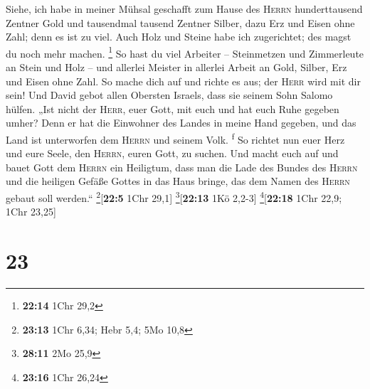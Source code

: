  Siehe, ich habe in meiner Mühsal geschafft zum Hause des
\textsc{Herrn} hunderttausend Zentner Gold und tausendmal tausend
Zentner Silber, dazu Erz und Eisen ohne Zahl; denn es ist zu viel. Auch
Holz und Steine habe ich zugerichtet; des magst du noch mehr machen.
\footnote{\textbf{22:14} 1Chr 29,2}  So hast du viel
Arbeiter -- Steinmetzen und Zimmerleute an Stein und Holz -- und
allerlei Meister in allerlei Arbeit  an Gold, Silber, Erz
und Eisen ohne Zahl. So mache dich auf und richte es aus; der
\textsc{Herr} wird mit dir sein!  Und David gebot allen
Obersten Israels, dass sie seinem Sohn Salomo hülfen. 
„Ist nicht der \textsc{Herr}, euer Gott, mit euch und hat euch Ruhe
gegeben umher? Denn er hat die Einwohner des Landes in meine Hand
gegeben, und das Land ist unterworfen dem \textsc{Herrn} und seinem
Volk. \textsuperscript{f}  So richtet nun euer Herz und
eure Seele, den \textsc{Herrn}, euren Gott, zu suchen. Und macht euch
auf und bauet Gott dem \textsc{Herrn} ein Heiligtum, dass man die Lade
des Bundes des \textsc{Herrn} und die heiligen Gefäße Gottes in das Haus
bringe, das dem Namen des \textsc{Herrn} gebaut soll werden.``
\footnote{\textbf{23:13} 1Chr 6,34; Hebr 5,4; 5Mo 10,8}{[}\textbf{22:5}
1Chr 29,1{]} \footnote{\textbf{28:11} 2Mo 25,9}{[}\textbf{22:13} 1Kö
2,2-3{]} \footnote{\textbf{23:16} 1Chr 26,24}{[}\textbf{22:18} 1Chr
22,9; 1Chr 23,25{]}

\hypertarget{section-22}{%
\section{23}\label{section-22}}

